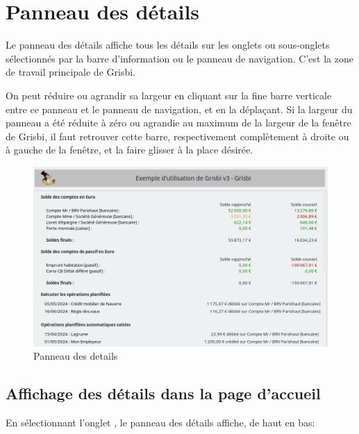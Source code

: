 \section{Panneau des détails\label{home-details}}

Le panneau des détails affiche tous les détails sur les onglets ou sous-onglets sélectionnés par la barre d'information ou le panneau de navigation. C'est la zone de travail principale de Grisbi.

On peut réduire ou agrandir sa largeur en cliquant sur la fine barre verticale entre ce panneau et le panneau de navigation, et en la déplaçant. Si la largeur du panneau a été réduite à zéro ou agrandie au maximum de la largeur de la fenêtre de Grisbi, il faut retrouver cette barre, respectivement complètement à droite ou à gauche de la fenêtre, et la faire glisser à la place désirée. 

\begin{figure}[htbp]			%
	\begin{center}
		\includegraphics[width=1\textwidth]{image/screenshot/home_details.png}
	\end{center}
	\caption{Panneau des details}		%
	\label{home_details}
\end{figure}

\subsection{Affichage des détails dans la page d'accueil\label{home-details-homepage}}

En sélectionnant l'onglet , le panneau des détails affiche, de haut en bas:


